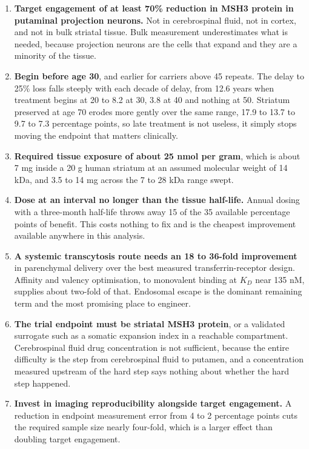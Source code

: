 \documentclass[conference]{IEEEtran}
\begin{document}
\begin{enumerate}
\item \textbf{Target engagement of at least 70\% reduction in MSH3 protein in putaminal projection neurons.} Not in cerebrospinal fluid, not in cortex, and not in bulk striatal tissue. Bulk measurement underestimates what is needed, because projection neurons are the cells that expand and they are a minority of the tissue.
\item \textbf{Begin before age 30}, and earlier for carriers above 45 repeats. The delay to 25\% loss falls steeply with each decade of delay, from 12.6 years when treatment begins at 20 to 8.2 at 30, 3.8 at 40 and nothing at 50. Striatum preserved at age 70 erodes more gently over the same range, 17.9 to 13.7 to 9.7 to 7.3 percentage points, so late treatment is not useless, it simply stops moving the endpoint that matters clinically.
\item \textbf{Required tissue exposure of about 25 nmol per gram}, which is about 7 mg inside a 20 g human striatum at an assumed molecular weight of 14 kDa, and 3.5 to 14 mg across the 7 to 28 kDa range swept.
\item \textbf{Dose at an interval no longer than the tissue half-life.} Annual dosing with a three-month half-life throws away 15 of the 35 available percentage points of benefit. This costs nothing to fix and is the cheapest improvement available anywhere in this analysis.
\item \textbf{A systemic transcytosis route needs an 18 to 36-fold improvement} in parenchymal delivery over the best measured transferrin-receptor design. Affinity and valency optimisation, to monovalent binding at $K_{D}$ near 135 nM, supplies about two-fold of that. Endosomal escape is the dominant remaining term and the most promising place to engineer.
\item \textbf{The trial endpoint must be striatal MSH3 protein}, or a validated surrogate such as a somatic expansion index in a reachable compartment. Cerebrospinal fluid drug concentration is not sufficient, because the entire difficulty is the step from cerebrospinal fluid to putamen, and a concentration measured upstream of the hard step says nothing about whether the hard step happened.
\item \textbf{Invest in imaging reproducibility alongside target engagement.} A reduction in endpoint measurement error from 4 to 2 percentage points cuts the required sample size nearly four-fold, which is a larger effect than doubling target engagement.
\end{enumerate}
\end{document}
